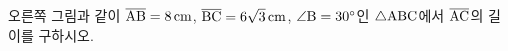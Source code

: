 \noindent\begin{minipage}[t]{0.58\linewidth}\vspace{0pt}\raggedright 오른쪽 그림과 같이 $\overline{\mathrm{AB}}=8\,\mathrm{cm}$, $\overline{\mathrm{BC}}=6\sqrt{3}\,\mathrm{cm}$, $\angle\mathrm{B}=30^\circ$인 $\triangle\mathrm{ABC}$에서 $\overline{\mathrm{AC}}$의 길이를 구하시오.\end{minipage}\hfill\begin{minipage}[t]{0.4\linewidth}\vspace{0pt}\centering \resizebox{\ifdim\width>\linewidth\linewidth\else\width\fi}{!}{}\end{minipage}\par
